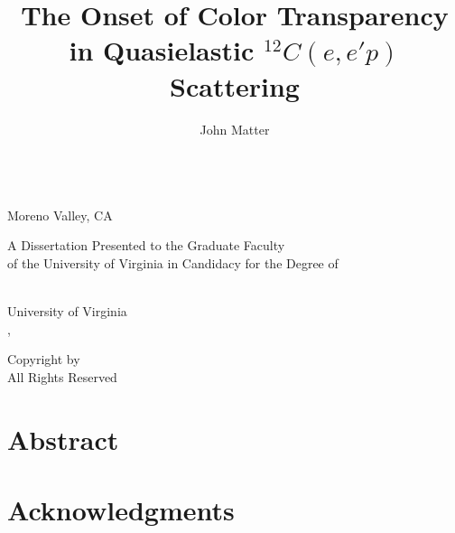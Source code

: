 \title{The Onset of Color Transparency in Quasielastic ${}^{12}C(e,e'p)$ Scattering}
\makeatletter
\bookmark[named=FirstPage]{\@title}
\makeatother

\makeatletter
\author{John Matter} \let\Author\@author
\newcommand{\hometown}{Moreno Valley, CA}

 \let\Year\@degreeyear
{}
\makeatother


\makeatletter
\def\maketitle{\begin{titlepage}
\doublespacing
\vspace{0.0in}
\large
{\LARGE\bf \@title \par}
\@author \\
\hometown
\par
\@prevdegrees
\par
A Dissertation Presented to the Graduate Faculty \\
of the University of Virginia in Candidacy for the Degree of \\
\@degree
\par
\@department \\
University of Virginia \\
\@degreemonth, \@degreeyear \\
\vspace{1.0in}

\begin{flushright}
\begin{minipage}{0.45\linewidth}
\mysignrule{}
\mysignrule{}
\mysignrule{}
\mysignrule{}
\end{minipage}
\end{flushright}

\end{titlepage}}
\makeatother
\maketitle

\pagestyle{plain}
\newpage
\vspace*{\fill}
\noindent \textcopyright Copyright by \Author {} \Year \\
All Rights Reserved

\cleardoublepage

\vspace{0.8in}
\section*{\center Abstract}


\cleardoublepage

\section*{Acknowledgments}

